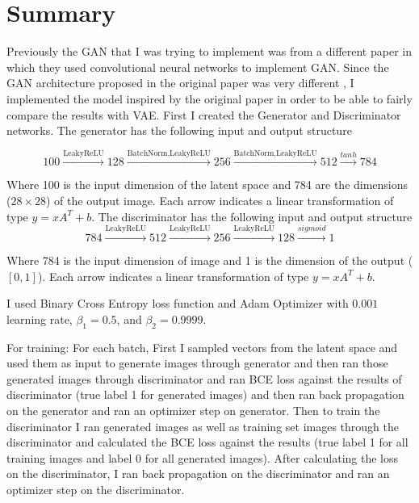 \documentclass{article}
\begin{document}
\thispagestyle{firstpage}

\section{Summary}

Previously the GAN that I was trying to implement was from a different paper \cite{1} in which they used convolutional neural networks to implement GAN. Since the GAN architecture proposed in the original paper was very different \cite{2}, I implemented the model inspired by the original paper in order to be able to fairly compare the results with VAE. First I created the Generator and Discriminator networks.
The generator has the following input and output structure

\begin{equation*}
    100 \xrightarrow{\text{LeakyReLU}} 128 \xrightarrow{\text{BatchNorm}, \text{LeakyReLU}} 256 \xrightarrow{\text{BatchNorm}, \text{LeakyReLU}} 512 \xrightarrow{tanh} 784
\end{equation*}

Where 100 is the input dimension of the latent space and 784 are the dimensions ($28\times28$) of the output image. Each arrow indicates a linear transformation of type $y=xA^T+b$.
The discriminator has the following input and output structure
\begin{equation*}
    784 \xrightarrow{\text{LeakyReLU}} 512 \xrightarrow{\text{LeakyReLU}} 256 \xrightarrow{\text{LeakyReLU}} 128 \xrightarrow{sigmoid} 1
\end{equation*}

Where 784 is the input dimension of image and 1 is the dimension of the output ($[0,1]$). Each arrow indicates a linear transformation of type $y=xA^T+b$.

I used Binary Cross Entropy loss function and Adam Optimizer with $0.001$ learning rate, $\beta_1=0.5$, and $\beta_2=0.9999$.

For training: For each batch, First I sampled vectors from the latent space and used them as input to generate images through generator and then ran those generated images through discriminator and ran BCE loss against the results of discriminator (true label 1 for generated images) and then ran back propagation on the generator and ran an optimizer step on generator. Then to train the discriminator I ran generated images as well as training set images through the discriminator and calculated the BCE loss against the results (true label 1 for all training images and label 0 for all generated images). After calculating the loss on the discriminator, I ran back propagation on the discriminator and ran an optimizer step on the discriminator.
\end{document}
